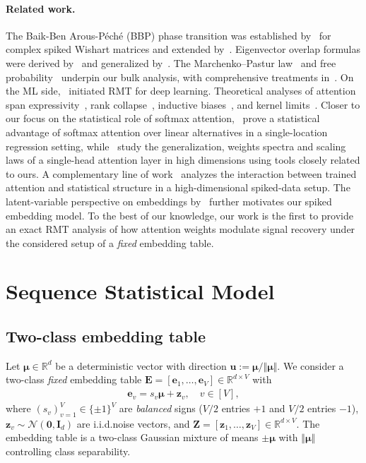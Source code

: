 \documentclass{article}
\def\vzero{{\bm{0}}}
\def\vmu{{\bm{\mu}}}
\def\ve{{\bm{e}}}
\def\vu{{\bm{u}}}
\def\vz{{\bm{z}}}
\def\mE{{\bm{E}}}
\def\mI{{\bm{I}}}
\def\mZ{{\bm{Z}}}
\def\gN{{\mathcal{N}}}
\def\sR{{\mathbb{R}}}
\begin{document}
\paragraph{Related work.}
The Baik-Ben Arous-Péché (BBP) phase transition was established by~\citet{baik2005phase} for complex spiked Wishart matrices and extended by~\citet{baik2006eigenvalues}. Eigenvector overlap formulas were derived by~\citet{paul2007asymptotics} and generalized by~\citet{benaych2011eigenvalues,benaych2012singular}. The Marchenko--Pastur law~\citep{marvcenko1967distribution} and free probability~\citep{nica2006lectures,mingo2017free} underpin our bulk analysis, with comprehensive treatments in~\citet{bai2010spectral,couillet2022random}. On the ML side,~\citet{pennington2017nonlinear} initiated RMT for deep learning. Theoretical analyses of attention span expressivity~\citep{yun2019transformers}, rank collapse~\citep{dong2021attention}, inductive biases~\citep{edelman2022inductive}, and kernel limits~\citep{hron2020infinite}. Closer to our focus on the statistical role of softmax attention,~\citet{duranthon2025statistical} prove a statistical advantage of softmax attention over linear alternatives in a single-location regression setting, while~\citet{boncoraglio2026singleheadattentionhighdimensions} study the generalization, weights spectra and scaling laws of a single-head attention layer in high dimensions using tools closely related to ours. A complementary line of work~\citep{jha2025random} analyzes the interaction between trained attention and statistical structure in a high-dimensional spiked-data setup. The latent-variable perspective on embeddings by~\citet{arora2016latent} further motivates our spiked embedding model. To the best of our knowledge, our work is the first to provide an exact RMT analysis of how attention weights modulate signal recovery under the considered setup of a \textit{fixed} embedding table.


\section{Sequence Statistical Model}\label{sec:statistical_model}

\subsection{Two-class embedding table}\label{sec:embed}
Let $\vmu\in \sR^d$ be a deterministic vector with direction $\vu := \vmu / \Vert \vmu \Vert$. We consider a two-class \textit{fixed} embedding table $\mE = [\ve_1, \ldots, \ve_V] \in \sR^{d\times V}$ with
\begin{align}\label{eq:embedding}
    \ve_v = s_v \vmu + \vz_v, \quad v\in [V],
\end{align}
where $(s_v)_{v=1}^V \in \{ \pm 1 \}^V$ are \textit{balanced} signs ($V/2$ entries $+1$ and $V/2$ entries $-1$), $\vz_v\sim \gN(\vzero, \mI_d)$ are i.i.d.\@ noise vectors, and $\mZ = [\vz_1, \ldots, \vz_V] \in \sR^{d\times V}$. The embedding table is a two-class Gaussian mixture of means $\pm \vmu$ with $\Vert \vmu\Vert$ controlling class separability.
\end{document}
